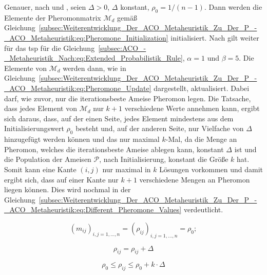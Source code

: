 \documentclass[fontsize=12, a4aper]{scrartcl}
\begin{document}
	Genauer, nach \cite{guntsch2002population} und \cite{FCM_2019}, seien \(\Delta > 0\), \(\Delta\) konstant, \(\rho_0 = 1/(n - 1)\). Dann werden die Elemente der Pheromonmatrix \(\mathcal{M}_d\) gemäß Gleichung~\ref{subsec:Weiterentwicklung_Der_ACO_Metaheuristik_Zu_Der_P_-_ACO_Metaheuristik:eq:Pheromone_Initialization} initialisiert. Nach \cite{guntsch2002population} gilt weiter für das \ac{tsp} für die Gleichung~\ref{subsec:ACO_-_Metaheuristik_Nach:eq:Extended_Probabilistik_Rule}, \(\alpha = 1\) und \(\beta = 5\). Die Elemente von \(\mathcal{M}_d\) werden dann, wie in Gleichung~\ref{subsec:Weiterentwicklung_Der_ACO_Metaheuristik_Zu_Der_P_-_ACO_Metaheuristik:eq:Pheromone_Update} dargestellt, aktualisiert. Dabei darf, wie zuvor, nur die iterationsbeste Ameise Pheromon legen. Die Tatsache, dass jedes Element von \(\mathcal{M}_d\) nur \(k + 1\) verschiedene Werte annehmen kann, ergibt sich daraus, dass, auf der einen Seite, jedes Element mindestens aus dem Initialisierungswert \(\rho_0\) besteht und, auf der anderen Seite, nur Vielfache von \(\Delta\) hinzugefügt werden können und das nur maximal \(k\)-Mal, da die Menge an Pheromon, welches die iterationsbeste Ameise ablegen kann, konstant \(\Delta\) ist und die Population der Ameisen \(\mathcal{P}\), nach Initialisierung, konstant die Größe \(k\) hat. Somit kann eine Kante \((i,j)\) nur maximal in \(k\) Lösungen vorkommen und damit ergibt sich, dass auf einer Kante nur \(k + 1\) verschiedene Mengen an Pheromon liegen können. Dies wird nochmal in der Gleichung~\ref{subsec:Weiterentwicklung_Der_ACO_Metaheuristik_Zu_Der_P_-_ACO_Metaheuristik:eq:Different_Pheromone_Values} verdeutlicht.
	
	\begin{equation} \label{subsec:Weiterentwicklung_Der_ACO_Metaheuristik_Zu_Der_P_-_ACO_Metaheuristik:eq:Pheromone_Initialization}
			(m_{ij})_{i,j = 1, \dots, n} = (\rho_{ij})_{i,j = 1, \dots, n} = \rho_0;
	\end{equation}
	
	\begin{equation} \label{subsec:Weiterentwicklung_Der_ACO_Metaheuristik_Zu_Der_P_-_ACO_Metaheuristik:eq:Pheromone_Update}
		\rho_{ij} = \rho_{ij} + \Delta
	\end{equation}
	
	\begin{equation} \label{subsec:Weiterentwicklung_Der_ACO_Metaheuristik_Zu_Der_P_-_ACO_Metaheuristik:eq:Different_Pheromone_Values}
		\rho_0 \leq \rho_{ij} \leq \rho_0 + k \cdot \Delta
	\end{equation}
	
\end{document}
